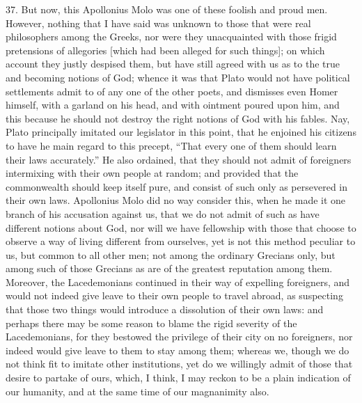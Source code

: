 37. But now, this Apollonius Molo was one of these foolish and proud men.
However, nothing that I have said was unknown to those that were real
philosophers among the Greeks, nor were they unacquainted with those
frigid pretensions of allegories [which had been alleged for such things];
on which account they justly despised them, but have still agreed with us
as to the true and becoming notions of God; whence it was that Plato would
not have political settlements admit to of any one of the other poets, and
dismisses even Homer himself, with a garland on his head, and with
ointment poured upon him, and this because he should not destroy the right
notions of God with his fables. Nay, Plato principally imitated our
legislator in this point, that he enjoined his citizens to have he main
regard to this precept, ``That every one of them should learn their laws
accurately.'' He also ordained, that they should not admit of foreigners
intermixing with their own people at random; and provided that the
commonwealth should keep itself pure, and consist of such only as
persevered in their own laws. Apollonius Molo did no way consider this,
when he made it one branch of his accusation against us, that we do not
admit of such as have different notions about God, nor will we have
fellowship with those that choose to observe a way of living different
from ourselves, yet is not this method peculiar to us, but common to all
other men; not among the ordinary Grecians only, but among such of those
Grecians as are of the greatest reputation among them. Moreover, the
Lacedemonians continued in their way of expelling foreigners, and would
not indeed give leave to their own people to travel abroad, as suspecting
that those two things would introduce a dissolution of their own laws: and
perhaps there may be some reason to blame the rigid severity of the
Lacedemonians, for they bestowed the privilege of their city on no
foreigners, nor indeed would give leave to them to stay among them;
whereas we, though we do not think fit to imitate other institutions, yet
do we willingly admit of those that desire to partake of ours, which, I
think, I may reckon to be a plain indication of our humanity, and at the
same time of our magnanimity also.

